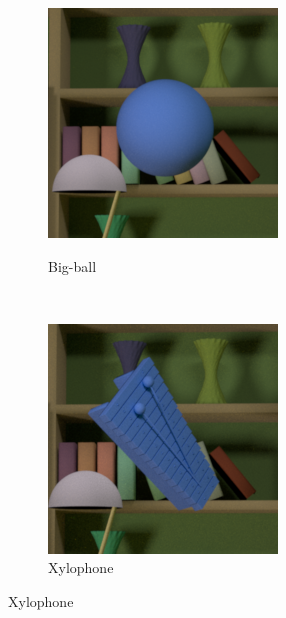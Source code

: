 \documentclass{jov}
\begin{document}
\begin{figure}
\centering
    \begin{subfigure}[b]{0.14 \textwidth}
        \caption{Big-ball}
        \includegraphics[width=\textwidth]{../FiguresDraft4/Figure4/Figure4_a.png}
        \label{fig:libraryWithBigBall}
    \end{subfigure}
     ~ 
    \begin{subfigure}[b]{0.14 \textwidth}
        \caption{Xylophone}
        \includegraphics[width=\textwidth]{../FiguresDraft4/Figure4/Figure4_b.png}

\end{subfigure}
\end{figure}
\end{document}
